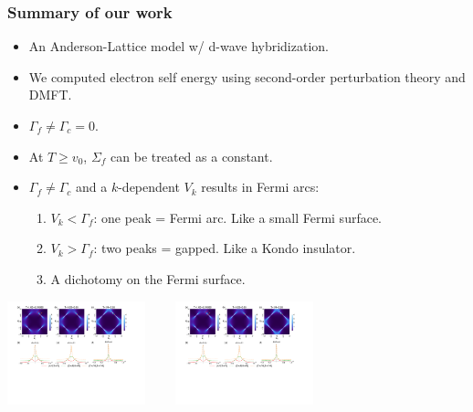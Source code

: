 \documentclass[xcolor=table, 10pt, aspectratio=169]{beamer}
\begin{document}
\begin{frame}
\frametitle{Summary of our work}
\begin{itemize}
\item<1-7> An Anderson-Lattice model w/ d-wave hybridization.
\item<2-5> We computed electron self energy using second-order perturbation theory and DMFT.
\item<3-8> $\Gamma_f\neq\Gamma_c=0$.
\item<4-6> At $T\geq v_0$, $\Sigma_f$ can be treated as a constant.
\item<5-9> $\Gamma_f\neq\Gamma_c$ and a $k$-dependent $V_k$ results in Fermi arcs:
\begin{enumerate}
\item $V_k<\Gamma_f$: one peak = Fermi arc. Like a small Fermi surface.
\item $V_k>\Gamma_f$: two peaks = gapped. Like a Kondo insulator.
\item A dichotomy on the Fermi surface.
\end{enumerate}
\end{itemize}
\begin{center}
	\includegraphics[height=3cm]{arc1}~~~~
	\includegraphics[height=3cm]{arc2}
\end{center}
\end{frame}


\end{document}
